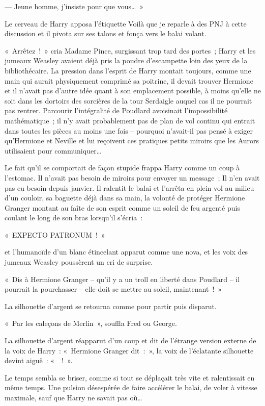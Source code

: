 --- Jeune homme, j'insiste pour que vous…~»

Le cerveau de Harry apposa l'étiquette Voilà que je reparle à des PNJ à cette discussion et il pivota sur ses talons et fonça vers le balai volant.

«~Arrêtez~!~»
cria Madame Pince, surgissant trop tard des portes~; Harry et les jumeaux Weasley avaient déjà pris la poudre d'escampette loin des yeux de la bibliothécaire.
La pression dans l'esprit de Harry montait toujours, comme une main qui aurait physiquement comprimé sa poitrine, il devait trouver Hermione et il n'avait pas d'autre idée quant à son emplacement possible, à moins qu'elle ne soit dans les dortoirs des sorcières de la tour Serdaigle auquel cas il ne pourrait pas rentrer.
Parcourir l'intégralité de Poudlard avoisinait l'impossibilité mathématique~; il n'y avait probablement pas de plan de vol continu qui entrait dans toutes les pièces au moins une fois -- pourquoi n'avait-il pas pensé à exiger qu'Hermione et Neville et lui reçoivent ces pratiques petits miroirs que les Aurors utilisaient pour communiquer…

Le fait qu'il se comportait de façon stupide frappa Harry comme un coup à l'estomac.
Il n'avait pas besoin de miroirs pour envoyer un message~; Il n'en avait pas eu besoin depuis janvier.
Il ralentit le balai et l'arrêta en plein vol au milieu d'un couloir, sa baguette déjà dans sa main, la volonté de protéger Hermione Granger montant au faîte de son esprit comme un soleil de feu argenté puis coulant le long de son bras lorsqu'il s'écria~:

«~EXPECTO PATRONUM~!~»

et l'humanoïde d'un blanc étincelant apparut comme une nova, et les voix des jumeaux Weasley poussèrent un cri de surprise.

«~Dis à Hermione Granger -- qu'il y a un troll en liberté dans Poudlard -- il pourrait la pourchasser -- elle doit se mettre au soleil, maintenant~!~»

La silhouette d'argent se retourna comme pour partir puis disparut.

«~Par les caleçons de Merlin~», souffla Fred ou George.

La silhouette d'argent réapparut d'un coup et dit de l'étrange version externe de la voix de Harry~: «~Hermione Granger dit~:~», la voix de l'éclatante silhouette devint aiguë~: «~~!~».

Le temps sembla se briser, comme si tout se déplaçait très vite et ralentissait en même temps.
Une pulsion désespérée de faire accélérer le balai, de voler à vitesse maximale, sauf que Harry ne savait pas où…

